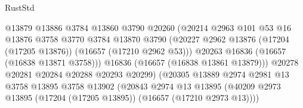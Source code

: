 \begin{lexlean}{RustStd}
\begin{coremodule}
                                          @13879
                                          @13886
                                          @3784
                                          @13860
                                          @3790
                                          @20260
                                          (@20214
                                            @2963
                                            @101
                                            @53
                                            @16
                                            @13876
                                            @3758
                                            @3770
                                            @3784
                                            @13870
                                            @3790
                                            (@20227
                                              @2962
                                              @13876
                                              (@17204 (@17205 @13876))
                                              (@16657 (@17210 @2962 @53)))
                                            @20263
                                            @16836
                                            (@16657 (@16838 @13871 @3758)))
                                          @16836
                                          (@16657 (@16838 @13861 @13879)))
                                        @20278
                                        @20281
                                        @20284
                                        @20288
                                        @20293
                                        @20299)
                                      (@20305
                                        @13889
                                        @2974
                                        @2981
                                        @13
                                        @3758
                                        @13895
                                        @3758
                                        @13902
                                        (@20843
                                          @2974
                                          @13
                                          @13895
                                          (@40209
                                            @2973
                                            @13895
                                            (@17204 (@17205 @13895))
                                            (@16657 (@17210 @2973 @13))))

\end{coremodule}
\end{lexlean}
